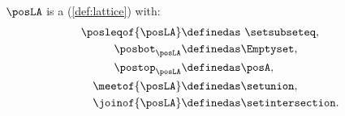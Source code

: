 \begin{lemma}
    $\posLA$ is a  (\cref{def:lattice}) with:
    \begin{equation*}
        \begin{aligned}
            \posleqof{\posLA} & \definedas \ \setsubseteq, \\
            \posbot_{\posLA}  & \definedas \Emptyset, \\
            \postop_{\posLA}  & \definedas \posA, \\
            \meetof{\posLA}   & \definedas \setunion, \\
            \joinof{\posLA}   & \definedas \setintersection.
        \end{aligned}
    \end{equation*}
\end{lemma}
